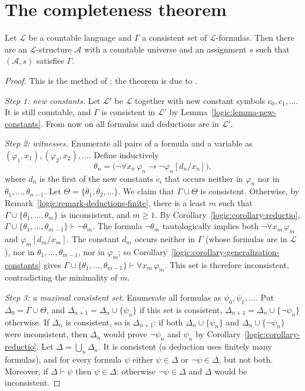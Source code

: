 \section{The completeness theorem}\label{logic:section-completeness}

\begin{theorem}\label{logic:theorem-model-existence}
Let $\mathcal{L}$ be a countable language and $\Gamma$ a consistent set of
$\mathcal{L}$-formulas. Then there are an $\mathcal{L}$-structure
$\mathcal{A}$ with a countable universe and an assignment $s$ such that
$(\mathcal{A}, s)$ satisfies $\Gamma$.
\end{theorem}

\begin{proof}
This is the method of \cite{henkin-1949}; the theorem is due to
\cite{godel-1930}.

\emph{Step 1: new constants.} Let $\mathcal{L}'$ be $\mathcal{L}$ together with
new constant symbols $c_0, c_1, \ldots$. It is still countable, and $\Gamma$ is
consistent in $\mathcal{L}'$ by Lemma~\ref{logic:lemma-new-constants}. From now
on all formulas and deductions are in $\mathcal{L}'$.

\emph{Step 2: witnesses.} Enumerate all pairs of a formula and a variable as
$(\varphi_1, x_1), (\varphi_2, x_2), \ldots$. Define inductively
\[
\theta_n = \bigl(\neg\forall x_n\, \varphi_n \to \neg\varphi_n[d_n/x_n]\bigr),
\]
where $d_n$ is the first of the new constants $c_i$ that occurs neither in
$\varphi_n$ nor in $\theta_1, \ldots, \theta_{n-1}$. Let
$\Theta = \{\theta_1, \theta_2, \ldots\}$. We claim that $\Gamma \cup \Theta$
is consistent. Otherwise, by Remark~\ref{logic:remark-deductions-finite}, there
is a least $m$ such that $\Gamma \cup \{\theta_1, \ldots, \theta_m\}$ is
inconsistent, and $m \geq 1$. By Corollary~\ref{logic:corollary-reductio},
$\Gamma \cup \{\theta_1, \ldots, \theta_{m-1}\} \vdash \neg\theta_m$. The formula
$\neg\theta_m$ tautologically implies both $\neg\forall x_m\,\varphi_m$ and
$\varphi_m[d_m/x_m]$. The constant $d_m$ occurs neither in $\Gamma$ (whose
formulas are in $\mathcal{L}$), nor in $\theta_1, \ldots, \theta_{m-1}$, nor in
$\varphi_m$; so Corollary~\ref{logic:corollary-generalization-constants} gives
$\Gamma \cup \{\theta_1, \ldots, \theta_{m-1}\} \vdash \forall x_m\,\varphi_m$.
This set is therefore inconsistent, contradicting the minimality of $m$.

\emph{Step 3: a maximal consistent set.} Enumerate all formulas as
$\psi_0, \psi_1, \ldots$. Put $\Delta_0 = \Gamma \cup \Theta$, and
$\Delta_{n+1} = \Delta_n \cup \{\psi_n\}$ if this set is consistent,
$\Delta_{n+1} = \Delta_n \cup \{\neg\psi_n\}$ otherwise. If $\Delta_n$ is
consistent, so is $\Delta_{n+1}$: if both $\Delta_n \cup \{\psi_n\}$ and
$\Delta_n \cup \{\neg\psi_n\}$ were inconsistent, then $\Delta_n$ would prove
$\neg\psi_n$ and $\psi_n$ by Corollary~\ref{logic:corollary-reductio}. Let
$\Delta = \bigcup_n \Delta_n$. It is consistent (a deduction uses finitely many
formulas), and for every formula $\psi$ either $\psi \in \Delta$ or
$\neg\psi \in \Delta$, but not both. Moreover, if $\Delta \vdash \psi$ then
$\psi \in \Delta$: otherwise $\neg\psi \in \Delta$ and $\Delta$ would be
inconsistent.


\end{proof}
